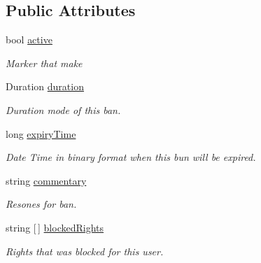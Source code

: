 \subsection*{Public Attributes}
\begin{DoxyCompactItemize}
\item 
bool \mbox{\hyperlink{struct_authority_controller_1_1_data_1_1_ban_information_afd9b25205b762ab78e319e6c5568a370}{active}}
\begin{DoxyCompactList}\small\item\em Marker that make \end{DoxyCompactList}\item 
Duration \mbox{\hyperlink{struct_authority_controller_1_1_data_1_1_ban_information_a462559f3def5024252cae059c7c96306}{duration}}
\begin{DoxyCompactList}\small\item\em Duration mode of this ban. \end{DoxyCompactList}\item 
long \mbox{\hyperlink{struct_authority_controller_1_1_data_1_1_ban_information_af579b3fb0849ed4f6b8302e2675628fa}{expiry\+Time}}
\begin{DoxyCompactList}\small\item\em Date Time in binary format when this bun will be expired. \end{DoxyCompactList}\item 
string \mbox{\hyperlink{struct_authority_controller_1_1_data_1_1_ban_information_a2782944663a51100498280d44212adb0}{commentary}}
\begin{DoxyCompactList}\small\item\em Resones for ban. \end{DoxyCompactList}\item 
string \mbox{[}$\,$\mbox{]} \mbox{\hyperlink{struct_authority_controller_1_1_data_1_1_ban_information_ae189ca37d8b49f5334008b17e96980ba}{blocked\+Rights}}
\begin{DoxyCompactList}\small\item\em Rights that was blocked for this user. \end{DoxyCompactList}\end{DoxyCompactItemize}
